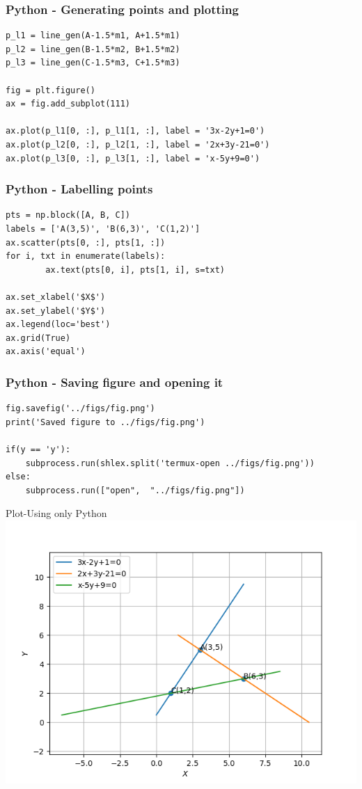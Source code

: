 \documentclass{beamer}
\begin{document}
\begin{frame}[fragile]
    \frametitle{Python - Generating points and plotting}
    \begin{lstlisting}
p_l1 = line_gen(A-1.5*m1, A+1.5*m1)
p_l2 = line_gen(B-1.5*m2, B+1.5*m2)
p_l3 = line_gen(C-1.5*m3, C+1.5*m3)

fig = plt.figure()
ax = fig.add_subplot(111)

ax.plot(p_l1[0, :], p_l1[1, :], label = '3x-2y+1=0')
ax.plot(p_l2[0, :], p_l2[1, :], label = '2x+3y-21=0')
ax.plot(p_l3[0, :], p_l3[1, :], label = 'x-5y+9=0')
\end{lstlisting}
\end{frame}

\begin{frame}[fragile]
    \frametitle{Python - Labelling points}
    \begin{lstlisting}
pts = np.block([A, B, C])
labels = ['A(3,5)', 'B(6,3)', 'C(1,2)']
ax.scatter(pts[0, :], pts[1, :])
for i, txt in enumerate(labels):
        ax.text(pts[0, i], pts[1, i], s=txt)

ax.set_xlabel('$X$')
ax.set_ylabel('$Y$')
ax.legend(loc='best')
ax.grid(True) 
ax.axis('equal')
    \end{lstlisting}
\end{frame}

\begin{frame}[fragile]
    \frametitle{Python - Saving figure and opening it}
    \begin{lstlisting}
fig.savefig('../figs/fig.png')
print('Saved figure to ../figs/fig.png')

if(y == 'y'):
    subprocess.run(shlex.split('termux-open ../figs/fig.png'))
else:
    subprocess.run(["open",  "../figs/fig.png"])
    \end{lstlisting}
\end{frame}


\begin{frame}{Plot-Using only Python}
    \centering
    \includegraphics[width=\columnwidth, height=0.8\textheight, keepaspectratio]{../figs/fig.png}     
\end{frame}
\end{document}
